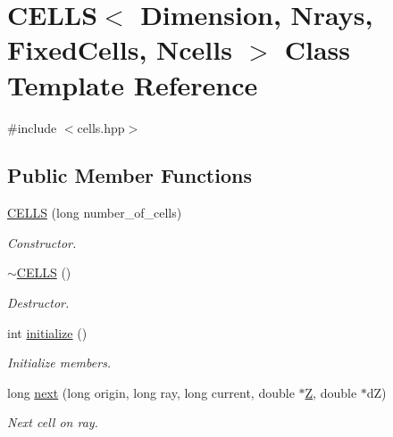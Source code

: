 \hypertarget{classCELLS}{}\section{C\+E\+L\+LS$<$ Dimension, Nrays, Fixed\+Cells, Ncells $>$ Class Template Reference}
\label{classCELLS}


{\ttfamily \#include $<$cells.\+hpp$>$}

\subsection*{Public Member Functions}
\begin{DoxyCompactItemize}
\item 
\mbox{\label{classCELLS_a03fa4d434e21b198d0f96b30ac303cd2}} 
\mbox{\hyperlink{classCELLS_a03fa4d434e21b198d0f96b30ac303cd2}{C\+E\+L\+LS}} (long number\+\_\+of\+\_\+cells)
\begin{DoxyCompactList}\small\item\em Constructor. \end{DoxyCompactList}\item 
\mbox{\label{classCELLS_afb81c2d8d6ed9c4de903406fd756c930}} 
\mbox{\hyperlink{classCELLS_afb81c2d8d6ed9c4de903406fd756c930}{$\sim$\+C\+E\+L\+LS}} ()
\begin{DoxyCompactList}\small\item\em Destructor. \end{DoxyCompactList}\item 
\mbox{\label{classCELLS_a09e52d0da2feba7dba6af80bbe83eb50}} 
int \mbox{\hyperlink{classCELLS_a09e52d0da2feba7dba6af80bbe83eb50}{initialize}} ()
\begin{DoxyCompactList}\small\item\em Initialize members. \end{DoxyCompactList}\item 
\mbox{\label{classCELLS_ab34660e9b13a4da52e19026c914a1de3}} 
long \mbox{\hyperlink{classCELLS_ab34660e9b13a4da52e19026c914a1de3}{next}} (long origin, long ray, long current, double $\ast$\mbox{\hyperlink{classCELLS_adfa802358c3f38d6fd88888e5a93d112}{Z}}, double $\ast$dZ)
\begin{DoxyCompactList}\small\item\em Next cell on ray. \end{DoxyCompactList}\end{DoxyCompactItemize}
